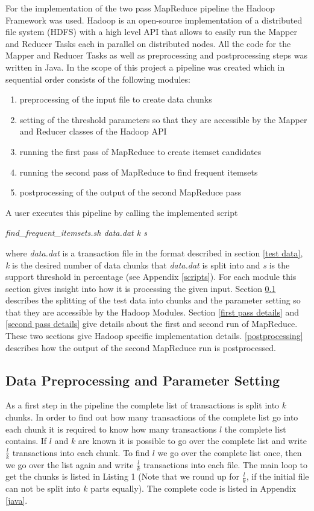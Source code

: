 For the implementation of the two pass MapReduce pipeline the Hadoop Framework was used. Hadoop is an open-source implementation of a distributed file system (HDFS) with a high level API that allows to easily run the Mapper and Reducer Tasks each in parallel on distributed nodes. All the code for the Mapper and Reducer Tasks as well as preprocessing and postprocessing steps was written in Java. In the scope of this project a pipeline was created which in sequential order consists of the following modules:
\begin{enumerate}
\item preprocessing of the input file to create data chunks 
\item setting of the threshold parameters so that they are accessible by the Mapper and Reducer classes of the Hadoop API
\item running the first pass of MapReduce to create itemset candidates
\item running the second pass of MapReduce to find frequent itemsets
\item postprocessing of the output of the second MapReduce pass
\end{enumerate}
A user executes this pipeline by calling the implemented script
\begin{center}
\textit{find\_frequent\_itemsets.sh data.dat k s}
\end{center}
where \textit{data.dat} is a transaction file in the format described in section \ref{test data}, \textit{k} is the desired number of data chunks that \textit{data.dat} is split into and \textit{s} is the support threshold in percentage (see Appendix \ref{scripts}).
For each module this section gives insight into how it is processing the given input. Section \ref{preprocessing} describes the splitting of the test data into chunks and the parameter setting so that they are accessible by the Hadoop Modules. Section \ref{first pass details} and \ref{second pass details} give details about the first and second run of MapReduce. These two sections give Hadoop specific implementation details. \ref{postprocessing} describes how the output of the second MapReduce run is postprocessed.

\subsection{Data Preprocessing and Parameter Setting}\label{preprocessing}
As a first step in the pipeline the complete list of transactions is split into $k$ chunks. In order to find out how many transactions of the complete list go into each chunk it is required to know how many transactions $l$ the complete list contains. If $l$ and $k$ are known it is possible to go over the complete list and write $\frac{l}{k}$ transactions into each chunk. To find $l$ we go over the complete list once, then we go over the list again and write $\frac{l}{k}$ transactions into each file. The main loop to get the chunks is listed in Listing 1 (Note that we round up for $\frac{l}{k}$, if the initial file can not be split into $k$ parts equally). The complete code is listed in Appendix \ref{java}.

